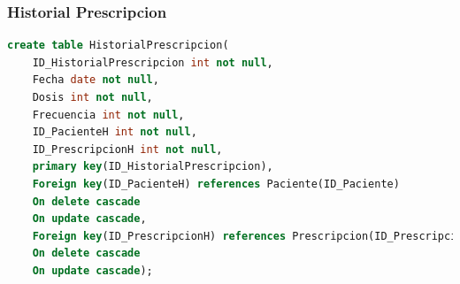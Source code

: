 \documentclass[10pt,letterpaper]{book}
\begin{document}
\subsubsection{Historial Prescripcion}
\begin{lstlisting}[language=sql]
create table HistorialPrescripcion(
	ID_HistorialPrescripcion int not null,
	Fecha date not null,
	Dosis int not null,
	Frecuencia int not null,
	ID_PacienteH int not null,
	ID_PrescripcionH int not null,
	primary key(ID_HistorialPrescripcion),
	Foreign key(ID_PacienteH) references Paciente(ID_Paciente)
	On delete cascade
	On update cascade,
	Foreign key(ID_PrescripcionH) references Prescripcion(ID_Prescripcion)
	On delete cascade
	On update cascade);
\end{lstlisting}
\end{document}
